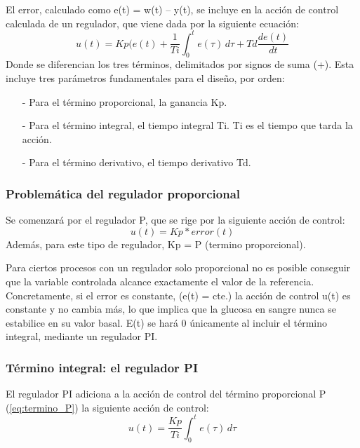 El error, calculado como e(t) = w(t) – y(t), se incluye en la acción de control calculada de un regulador, que viene dada por la siguiente ecuación:
\begin{equation}
u(t) = Kp (e(t) + \frac{1}{Ti} \int_{0}^{t} e(\tau) \, d\tau + Td \frac{d e(t)}{dt}
\label{eq:eq_regulador}
\end{equation}
Donde se diferencian los tres términos, delimitados por signos de suma (+). Esta incluye tres parámetros fundamentales para el diseño, por orden:
\begin{enumerate}
    \item[-] Para el término proporcional, la ganancia Kp.
    \item[-] Para el término integral, el tiempo integral Ti. Ti es el tiempo que tarda la acción.
    \item[-] Para el término derivativo, el tiempo derivativo Td.
\end{enumerate}

\subsubsection{Problemática del regulador proporcional}
\label{sec:problematica_P}
Se comenzará por el regulador P, que se rige por la siguiente acción de control:
\begin{equation}
u(t) = Kp * error(t)
\label{eq:termino_P}
\end{equation}
Además, para este tipo de regulador, Kp = P (termino proporcional).

Para ciertos procesos con un regulador solo proporcional no es posible conseguir que la variable controlada alcance exactamente el valor de la referencia. Concretamente, si el error es constante, (e(t) = cte.) la acción de control u(t) es constante y no cambia más, lo que implica que la glucosa en sangre nunca se estabilice en su valor basal. E(t) se hará 0 únicamente al incluir el término integral, mediante un regulador PI.

\subsubsection{Término integral: el regulador PI}

El regulador PI adiciona a la acción de control del término proporcional P (\ref{eq:termino_P}) la siguiente acción de control:
\begin{equation}
u(t) = \frac{Kp}{Ti}\int_{0}^{t} e(\tau) \, d\tau
\label{eq:termino_I}
\end{equation}

